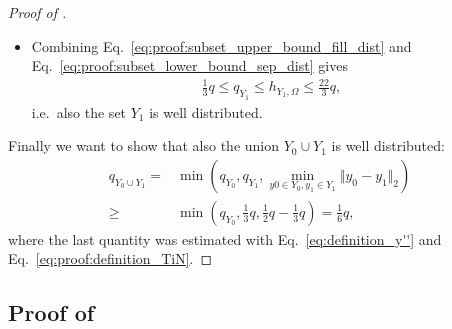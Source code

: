 \documentclass[a4paper, 10pt]{article}
\begin{document}
\begin{proof}[Proof of ]
\begin{itemize}
Thus we finally obtain
\begin{align}
\label{eq:proof:subset_lower_bound_sep_dist}
q_{Y_1} \geq 2q_{Y_1''} - \frac{2}{3} q \geq q - \frac{2}{3}q = \frac{1}{3}q.
\end{align}
\item Combining Eq.\ \eqref{eq:proof:subset_upper_bound_fill_dist} and Eq.\ \eqref{eq:proof:subset_lower_bound_sep_dist} gives
\begin{align*}
\frac{1}{3} q \leq q_{Y_1} \leq h_{Y_1, \Omega} \leq \frac{22}{3}q,
\end{align*}
i.e.\ also the set $Y_1$ is well distributed.
\end{itemize}
Finally we want to show that also the union $Y_0 \cup Y_1$ is well distributed:
\begin{align*}
q_{Y_0 \cup Y_1} =& \min (q_{Y_0}, q_{Y_1}, \min_{y0 \in Y_0, y_1 \in Y_1} \Vert y_0 - y_1 \Vert_2) \\
\geq& \min \left(q_{Y_0}, \frac{1}{3}q, \frac{1}{2}q - \frac{1}{3}q \right) = \frac{1}{6}q,
\end{align*}
where the last quantity was estimated with Eq.~\eqref{eq:definition_y''} and Eq.~\eqref{eq:proof:definition_TiN}.
\end{proof}






\subsection{Proof of }
\end{document}
